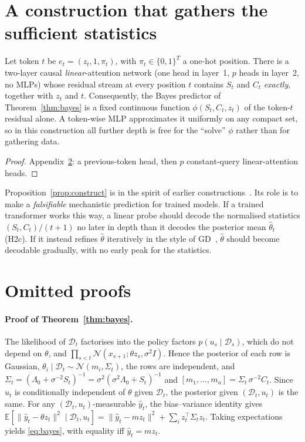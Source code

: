\section{A construction that gathers the sufficient statistics}\label{app:construct}
\begin{proposition}\label{prop:construct}
Let token $t$ be $e_t=(z_t,1,\pi_t)$, with $\pi_t\in\{0,1\}^T$ a one-hot position. There is a two-layer causal
\emph{linear}-attention network (one head in layer~1, $p$ heads in layer~2, no MLPs) whose residual stream at every
position $t$ contains $S_t$ and $C_t$ \emph{exactly}, together with $z_t$ and $t$. Consequently,
the Bayes predictor of Theorem~\ref{thm:bayes} is a fixed continuous function $\phi(S_t,C_t,z_t)$ of the token-$t$
residual alone. A token-wise MLP approximates it uniformly on any compact set, so in this construction all
further depth is free for the ``solve'' $\phi$ rather than for gathering data.
\end{proposition}
\begin{proof}
Appendix~\ref{app:proofs}: a previous-token head, then $p$ constant-query linear-attention heads.
\end{proof}

Proposition~\ref{prop:construct} is in the spirit of earlier
constructions~\citep{akyurek2022learning,bai2023transformers,vonoswald2023transformers}. Its role is to make a
\emph{falsifiable} mechanistic prediction for trained models. If a
trained transformer works this way, a linear probe should decode the normalised statistics
$(S_t,C_t)/(t{+}1)$ no later in depth than it decodes the posterior mean
$\hat\theta_t$ (H2c). If it instead refines $\hat\theta$ iteratively in the style of GD~\citep{vonoswald2023transformers},
$\hat\theta$ should become decodable gradually, with no early peak for the statistics.

\section{Omitted proofs}\label{app:proofs}

\paragraph{Proof of Theorem~\ref{thm:bayes}.}
The likelihood of $\mathcal{D}_t$ factorises into the policy factors $p(u_s\mid\mathcal{D}_s)$, which do not depend on
$\theta$, and $\prod_{s<t}\mathcal{N}(x_{s+1};\theta z_s,\sigma^2 I)$. Hence the posterior of each row is Gaussian,
$\theta_i\mid\mathcal{D}_t\sim\mathcal{N}(m_i,\Sigma_t)$, the rows are independent, and
$\Sigma_t=(\Lambda_0+\sigma^{-2}S_t)^{-1}=\sigma^2(\sigma^2\Lambda_0+S_t)^{-1}$ and
$[m_1,\dots,m_n]=\Sigma_t\,\sigma^{-2}C_t$. Since $u_t$ is conditionally independent of $\theta$ given $\mathcal{D}_t$, the posterior
given $(\mathcal{D}_t,u_t)$ is the same. For any $(\mathcal{D}_t,u_t)$-measurable $\hat y_t$, the bias--variance identity gives
$\mathbb{E}[\|\hat y_t-\theta z_t\|^2\mid\mathcal{D}_t,u_t]=\|\hat y_t-mz_t\|^2+\sum_i z_t^\top\Sigma_t z_t$.
Taking expectations yields \eqref{eq:bayes}, with equality iff $\hat y_t=mz_t$.


